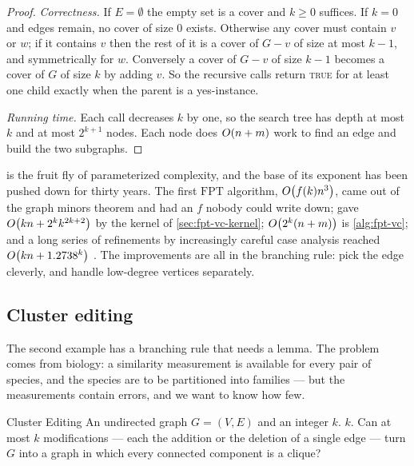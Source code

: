 \begin{proof}
\emph{Correctness.} If $E = \emptyset$ the empty set is a cover and $k \ge 0$
suffices. If $k = 0$ and edges remain, no cover of size $0$ exists. Otherwise
any cover must contain $v$ or $w$; if it contains $v$ then the rest of it is a
cover of $G - v$ of size at most $k-1$, and symmetrically for $w$. Conversely a
cover of $G - v$ of size $k-1$ becomes a cover of $G$ of size $k$ by adding $v$.
So the recursive calls return \textsc{true} for at least one child exactly when
the parent is a yes-instance.

\emph{Running time.} Each call decreases $k$ by one, so the search tree has
depth at most $k$ and at most $2^{k+1}$ nodes. Each node does $O\!\left(n+m\right)$ work
to find an edge and build the two subgraphs.
\end{proof}

\begin{remark}\label{rem:fpt-vc-history}
 is the fruit fly of parameterized complexity, and the base
of its exponent has been pushed down for thirty years. The first
$\mathrm{FPT}$ algorithm, $O\!\left(f(k)n^3\right)$, came out of the graph minors
theorem and had an $f$ nobody could write down; \citet{BussGoldsmith1993} gave
$O\!\left(kn + 2^kk^{2k+2}\right)$ by the kernel of \cref{sec:fpt-vc-kernel};
$O\!\left(2^k(n+m)\right)$ is \cref{alg:fpt-vc}; and a long series of refinements by
increasingly careful case analysis reached $O\!\left(kn + 1.2738^k\right)$
\citep{ChenKanjXia2010}. The improvements are all in the branching rule: pick
the edge cleverly, and handle low-degree vertices separately.
\end{remark}

\subsection{Cluster editing}

The second example has a branching rule that needs a lemma. The problem comes
from biology: a similarity measurement is available for every pair of species,
and the species are to be partitioned into families --- but the measurements
contain errors, and we want to know how few.

\begin{probdef}{Cluster Editing}
  \instance An undirected graph $G = (V,E)$ and an integer $k$.
  \parameter $k$.
  \question Can at most $k$ modifications --- each the addition or the deletion
  of a single edge --- turn $G$ into a graph in which every connected component
  is a clique?
\end{probdef}

